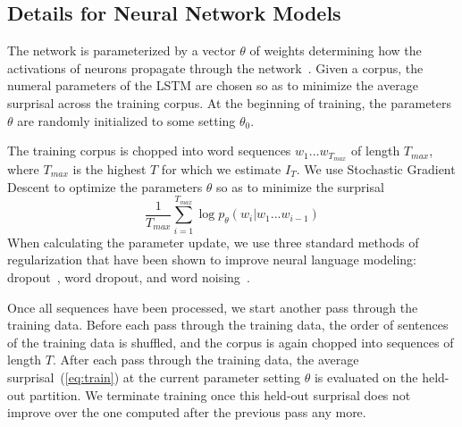 \documentclass[11pt,letterpaper]{article}
\begin{document}
%
%
%
%
%



\subsection{Details for Neural Network Models}

The network is parameterized by a vector $\theta$ of weights determining how the activations of neurons propagate through the network~\citep{hochreiter-long-1997}.
Given a corpus, the numeral parameters of the LSTM are chosen so as to minimize the average surprisal across the training corpus.
At the beginning of training, the parameters $\theta$ are randomly initialized to some setting $\theta_0$.

The training corpus is chopped into word sequences $w_1 ... w_{T_{max}}$ of length ${T_{max}}$, where ${T_{max}}$ is the highest $T$ for which we estimate $I_T$. %
We use Stochastic Gradient Descent to optimize the parameters $\theta$ so as to minimize the surprisal
\begin{equation}\label{eq:train}
	\frac{1}{T_{max}} \sum_{i=1}^{T_{max}} \log p_\theta(w_i|w_1...w_{i-1})
\end{equation}
When calculating the parameter update, we use three standard methods of regularization that have been shown to improve neural language modeling: dropout~\citep{srivastava-dropout:-2014}, word dropout, and word noising~\citep{xie2017data}.

Once all sequences have been processed, we start another pass through the training data.
Before each pass through the training data, the order of sentences of the training data is shuffled, and the corpus is again chopped into sequences of length $T$.
After each pass through the training data, the average surprisal~(\ref{eq:train}) at the current parameter setting $\theta$ is evaluated on the held-out partition.
We terminate training once this held-out  surprisal does not improve over the one computed after the previous pass any more.
\end{document}
